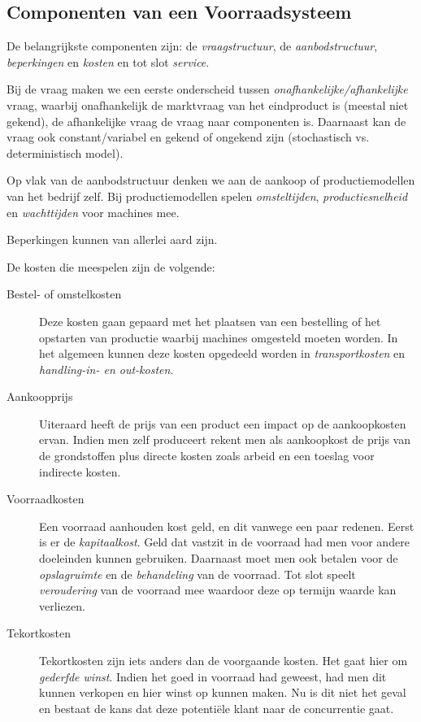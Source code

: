 \subsection{Componenten van een Voorraadsysteem}
De belangrijkste componenten zijn: de \textit{vraagstructuur}, de \textit{aanbodstructuur}, \textit{beperkingen} en \textit{kosten} en tot slot \textit{service}.

Bij de vraag maken we een eerste onderscheid tussen \textit{onafhankelijke/afhankelijke} vraag, waarbij onafhankelijk de marktvraag van het eindproduct is (meestal niet gekend), de afhankelijke vraag de vraag naar componenten is. Daarnaast kan de vraag ook constant/variabel en gekend of ongekend zijn (stochastisch vs. deterministisch model).

Op vlak van de aanbodstructuur denken we aan de aankoop of productiemodellen van het bedrijf zelf. Bij productiemodellen spelen \textit{omsteltijden}, \textit{productiesnelheid} en \textit{wachttijden} voor machines mee.

Beperkingen kunnen van allerlei aard zijn.

De kosten die meespelen zijn de volgende:
\begin{description}
    \item[Bestel- of omstelkosten] Deze kosten gaan gepaard met het plaatsen van een bestelling of het opstarten van productie waarbij machines omgesteld moeten worden. In het algemeen kunnen deze kosten opgedeeld worden in \textit{transportkosten} en \textit{handling-in- en out-kosten}.
    \item[Aankoopprijs] Uiteraard heeft de prijs van een product een impact op de aankoopkosten ervan. Indien men zelf produceert rekent men als aankoopkost de prijs van de grondstoffen plus directe kosten zoals arbeid en een toeslag voor indirecte kosten.
    \item[Voorraadkosten] Een voorraad aanhouden kost geld, en dit vanwege een paar redenen. Eerst is er de \textit{kapitaalkost}. Geld dat vastzit in de voorraad had men voor andere doeleinden kunnen gebruiken. Daarnaast moet men ook betalen voor de \textit{opslagruimte} en de \textit{behandeling} van de voorraad. Tot slot speelt \textit{veroudering} van de voorraad mee waardoor deze op termijn waarde kan verliezen.
    \item[Tekortkosten] Tekortkosten zijn iets anders dan de voorgaande kosten. Het gaat hier om \textit{gederfde winst}. Indien het goed in voorraad had geweest, had men dit kunnen verkopen en hier winst op kunnen maken. Nu is dit niet het geval en bestaat de kans dat deze potenti\"ele klant naar de concurrentie gaat.
\end{description}


